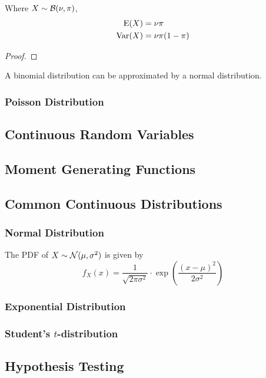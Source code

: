 \begin{theorem}
Where \(X \sim \operatorname{\mathcal{B}}(\nu, \pi)\),
\begin{align*}
\operatorname{\mathrm{E}}(X) &= \nu \pi \\
\operatorname{\mathrm{Var}}(X) &= \nu \pi (1 - \pi)
\end{align*}
\end{theorem}
\begin{proof}
\end{proof}

A binomial distribution can be approximated by a normal distribution.

\subsubsection{Poisson Distribution}


\subsection{Continuous Random Variables}

\subsection{Moment Generating Functions}

\subsection{Common Continuous Distributions}

\subsubsection{Normal Distribution}


The PDF of \(X \sim \operatorname{\mathcal{N}}(\mu, \sigma^2)\) is given by
\begin{equation*}
f_X(x) = \frac 1{\sqrt{2\pi\sigma^2}} \cdot
    \exp(\frac{(x - \mu)^2}{2\sigma^2})
\end{equation*}

\subsubsection{Exponential Distribution}

\subsubsection[Student's \texorpdfstring{\(t\)}{t}-distribution]
              {Student's \boldmath\(t\)-distribution}

\subsection{Hypothesis Testing}

